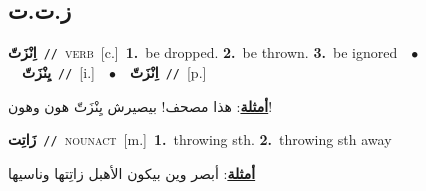 \documentclass[10pt,a4paper,twoside]{article} %
\begin{document}
\begin{multicols}{2}
{{{{{{{\vspace{-3mm}
\subsection*{\color{blue}\foreignlanguage{arabic}{ز.ت.ت}\color{blue}{}} 

{\setlength\topsep{0pt}\textbf{\foreignlanguage{arabic}{اِنْزَتّ}}\ {\color{gray}\texttt{//}\color{black}}\ \textsc{verb}\ [c.]\ \textbf{1.}~be dropped.  \textbf{2.}~be thrown.  \textbf{3.}~be ignored\ \ $\bullet$\ \ \setlength\topsep{0pt}\textbf{\foreignlanguage{arabic}{يِنْزَتّ}}\ {\color{gray}\texttt{//}\color{black}}\ [i.]\ \ $\bullet$\ \ \setlength\topsep{0pt}\textbf{\foreignlanguage{arabic}{اِنْزَتّ}}\ {\color{gray}\texttt{//}\color{black}}\ [p.]\  \begin{flushright}\color{gray}\foreignlanguage{arabic}{\textbf{\underline{\foreignlanguage{arabic}{أمثلة}}}: هذا مصحف! بيصيرش يِنْزَتّ هون وهون!}\end{flushright}\color{black}} \vspace{2mm}

{\setlength\topsep{0pt}\textbf{\foreignlanguage{arabic}{زَاتِت}}\ {\color{gray}\texttt{//}\color{black}}\ \textsc{noun\textunderscore act}\ [m.]\ \textbf{1.}~throwing sth.  \textbf{2.}~throwing sth away\  \begin{flushright}\color{gray}\foreignlanguage{arabic}{\textbf{\underline{\foreignlanguage{arabic}{أمثلة}}}: أبصر وين بيكون الأهبل زاتِتها وناسيها}\end{flushright}\color{black}} \vspace{2mm}

}}}}}}}
\end{multicols}
\end{document}
